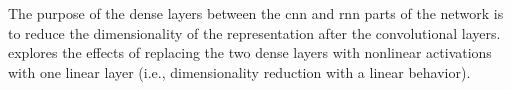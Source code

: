 
The purpose of the dense layers between the \gls{cnn} and
\gls{rnn} parts of the network is to reduce the
dimensionality of the representation after the convolutional
layers.  explores the
effects of replacing the two dense layers with nonlinear
activations with one linear layer (i.e., dimensionality
reduction with a linear behavior). 
